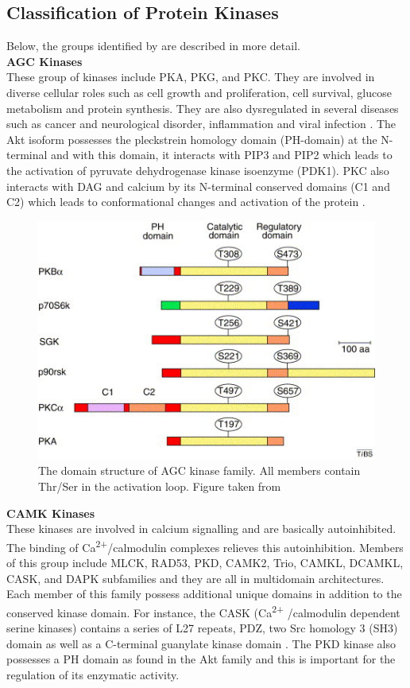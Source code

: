 \documentclass[a4paper, 11pt]{article}
\begin{document}
\subsection*{Classification of Protein Kinases}
Below, the groups identified by \cite{manning2002protein} are described in more detail. \\

\textbf{AGC Kinases}\\
These group of kinases include PKA, PKG, and PKC. They are involved in diverse cellular roles such as cell growth and proliferation, cell survival, glucose metabolism and protein synthesis. They are also dysregulated in several diseases such as cancer and neurological disorder, inflammation and viral infection \cite {rakshambikai2015typical}. The Akt isoform possesses the pleckstrein homology domain (PH-domain) at the N-terminal and with this domain, it interacts with PIP3 and PIP2  which leads to the activation of pyruvate dehydrogenase kinase isoenzyme (PDK1). PKC also interacts with DAG and calcium by its N-terminal conserved domains (C1 and C2) which leads to conformational changes and activation of the protein \cite{duong2013human}.\\
\begin{figure}[H]
	\includegraphics[width=.8\linewidth]{figures/agc_kinase.jpg}
	\centering
	\caption{The domain structure of AGC kinase family. All members contain Thr/Ser in the activation loop. Figure taken from \cite{brazil2001ten} }
	\label{agc_kinase}
\end{figure}
\textbf{CAMK Kinases}\\
These kinases are involved in calcium signalling and are basically autoinhibited. The binding of Ca\textsuperscript{2+}/calmodulin complexes relieves this autoinhibition. Members of this group include MLCK, RAD53, PKD, CAMK2, Trio, CAMKL, DCAMKL, CASK, and DAPK subfamilies and they are all in multidomain architectures. Each member of this family possess additional unique domains in addition to the conserved kinase domain. For instance, the CASK (Ca\textsuperscript{2+} /calmodulin dependent serine kinases) contains a series of L27 repeats, PDZ, two Src homology 3 (SH3) domain as well as a C-terminal guanylate kinase domain \cite{rakshambikai2015typical}. The PKD kinase also possesses a PH domain as found in the Akt family and this is important for the regulation of its enzymatic activity.\\
\end{document}
